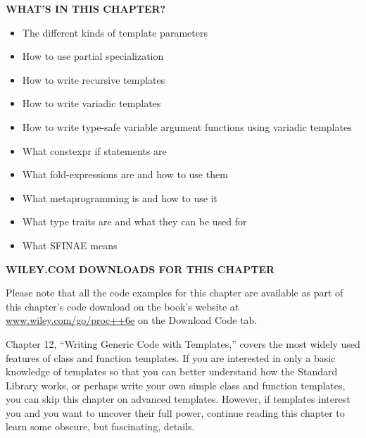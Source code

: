 \noindent
\textbf{WHAT’S IN THIS CHAPTER?}

\begin{itemize}
\item
The different kinds of template parameters

\item
How to use partial specialization

\item
How to write recursive templates

\item
How to write variadic templates

\item
How to write type-safe variable argument functions using variadic templates

\item
What constexpr if statements are

\item
What fold-expressions are and how to use them

\item
What metaprogramming is and how to use it

\item
What type traits are and what they can be used for

\item
What SFINAE means
\end{itemize}

\noindent
\textbf{WILEY.COM DOWNLOADS FOR THIS CHAPTER}

Please note that all the code examples for this chapter are available as part of this chapter’s code download on the book’s website at \url{www.wiley.com/go/proc++6e} on the Download Code tab.

Chapter 12, “Writing Generic Code with Templates,” covers the most widely used features of class and function templates. If you are interested in only a basic knowledge of templates so that you can better understand how the Standard Library works, or perhaps write your own simple class and function templates, you can skip this chapter on advanced templates. However, if templates interest you and you want to uncover their full power, continue reading this chapter to learn some obscure, but fascinating, details.


















